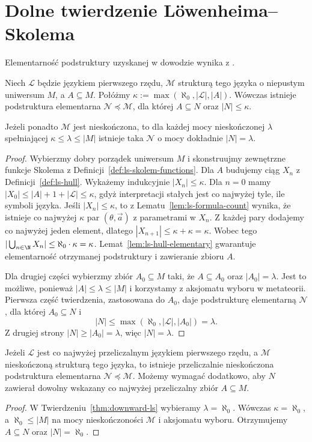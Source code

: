 \section{Dolne twierdzenie Löwenheima--Skolema}
Elementarność podstruktury uzyskanej w dowodzie wynika z .

\begin{twierdzenie}
\label{thm:downward-ls}
Niech $\mathcal L$ będzie językiem pierwszego
rzędu, $\mathcal M$ strukturą tego języka
o niepustym uniwersum $M$, a $A\subseteq M$.
Połóżmy $\kappa:=\max(\aleph_0,|\mathcal L|,|A|)$.
Wówczas istnieje podstruktura elementarna
$\mathcal N\preccurlyeq\mathcal M$, dla której
$A\subseteq N$ oraz $|N|\le\kappa$.

Jeżeli ponadto $\mathcal M$ jest nieskończona,
to dla każdej mocy nieskończonej $\lambda$
spełniającej $\kappa\le\lambda\le |M|$
istnieje taka $\mathcal N$ o mocy
dokładnie $|N|=\lambda$.
\end{twierdzenie}
\begin{proof}
Wybierzmy dobry porządek uniwersum $M$
i skonstruujmy zewnętrzne funkcje Skolema
z Definicji~\ref{def:ls-skolem-functions}.
Dla $A$ budujemy ciąg $X_n$
z Definicji~\ref{def:ls-hull}.
Wykażemy indukcyjnie $|X_n|\le\kappa$.
Dla $n=0$ mamy
$|X_0|\le |A|+1+|\mathcal L|\le\kappa$,
gdyż interpretacji stałych jest co najwyżej
tyle, ile symboli języka.
Jeśli $|X_n|\le\kappa$, to
z Lematu~\ref{lem:ls-formula-count}
wynika, że istnieje co najwyżej
$\kappa$ par $(\theta,\vec a)$ z parametrami
w $X_n$. Z każdej pary dodajemy
co najwyżej jeden element, dlatego
$|X_{n+1}|\le\kappa+\kappa=\kappa$.
Wobec tego
$|\bigcup_{n\in\N}X_n|
\le\aleph_0\cdot\kappa=\kappa$.
Lemat~\ref{lem:ls-hull-elementary}
gwarantuje elementarność otrzymanej
podstruktury i zawieranie zbioru $A$.

Dla drugiej części wybierzmy zbiór
$A_0\subseteq M$ taki, że
$A\subseteq A_0$ oraz $|A_0|=\lambda$.
Jest to możliwe, ponieważ
$|A|\le\lambda\le|M|$ i korzystamy
z aksjomatu wyboru w metateorii.
Pierwsza część twierdzenia, zastosowana
do $A_0$, daje podstrukturę elementarną
$\mathcal N$, dla której
$A_0\subseteq N$ i
\[
|N|\le\max(\aleph_0,|\mathcal L|,|A_0|)
     =\lambda.
\]
Z drugiej strony $|N|\ge|A_0|=\lambda$,
więc $|N|=\lambda$.
\end{proof}

\begin{wniosek}
\label{cor:downward-countable}
Jeżeli $\mathcal L$ jest co najwyżej przeliczalnym
językiem pierwszego rzędu, a $\mathcal M$
nieskończoną strukturą tego języka,
to istnieje przeliczalnie nieskończona
podstruktura elementarna
$\mathcal N\preccurlyeq\mathcal M$.
Możemy wymagać dodatkowo, aby $N$
zawierał dowolny wskazany
co najwyżej przeliczalny zbiór $A\subseteq M$.
\end{wniosek}
\begin{proof}
W Twierdzeniu~\ref{thm:downward-ls}
wybieramy $\lambda=\aleph_0$.
Wówczas $\kappa=\aleph_0$, a
$\aleph_0\le|M|$ na mocy nieskończoności
$\mathcal M$ i aksjomatu wyboru.
Otrzymujemy $A\subseteq N$ oraz $|N|=\aleph_0$.
\end{proof}

